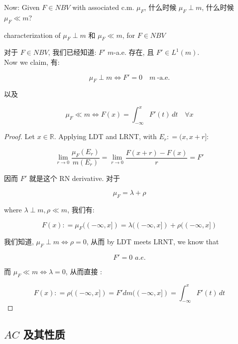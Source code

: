 \documentclass{qlnotes-export}
\begin{document}
Now: Given \(F \in NBV\) with associated c.m. \(\mu_{F}\), 什么时候 \(\mu_{F} \perp m\), 什么时候 \(\mu_{F} \ll m\)?

\begin{theorem}{characterization of \(\mu_{F} \perp m\) 和 \(\mu_{F} \ll m\), for
\(F \in NBV\)}\label{thm-12-differentiation-on-real-spaces-characterization-of-mu-f-perp-m-mu-f-ll-m-for-f-in-nbv}

对于 \(F \in NBV\), 我们已经知道: \(F'\) \(m\)-a.e. 存在, 且 \(F' \in L^{1}(m)\).\\
Now we claim, 有:

\[\mu_{F} \perp m\Leftrightarrow F' = 0\quad m\ \text{-a.e.}\]

以及

\[\mu_{F} \ll m\Leftrightarrow F(x) = \int_{- \infty}^{x}F'(t)\, dt\quad\forall x\]

\end{theorem}

\begin{proof}

Let \(x \in {\mathbb{R}}\). Applying LDT and LRNT, with \(E_{r}: = (x,x + r\rbrack\):

\[\lim\limits_{r\rightarrow 0}\frac{\mu_{F}(E_{r})}{m(E_{r})} = \lim\limits_{r\rightarrow 0}\frac{F(x + r) - F(x)}{r} = F'\]

因而 \(F'\) 就是这个 RN derivative. 对于

\[\mu_{F} = \lambda + \rho\]

where \(\lambda \perp m,\rho \ll m\), 我们有:

\[F(x): = \mu_{F}(( - \infty,x\rbrack) = \lambda(( - \infty,x\rbrack) + \rho(( - \infty,x\rbrack)\]

我们知道, \(\mu_{F} \perp m\Leftrightarrow\rho = 0\), 从而 by LDT meets LRNT, we know that

\[F' = 0\,\, a.e.\]

而 \(\mu_{F} \ll m\Leftrightarrow\lambda = 0\), 从而直接 :

\[F(x): = \rho(( - \infty,x\rbrack) = F'dm(( - \infty,x\rbrack) = \int_{- \infty}^{x}F'(t)\, dt\]

\end{proof}

\subsection{\texorpdfstring{\(AC\) 及其性质}{AC 及其性质}}\label{ac-ux53caux5176ux6027ux8d28}
\end{document}
